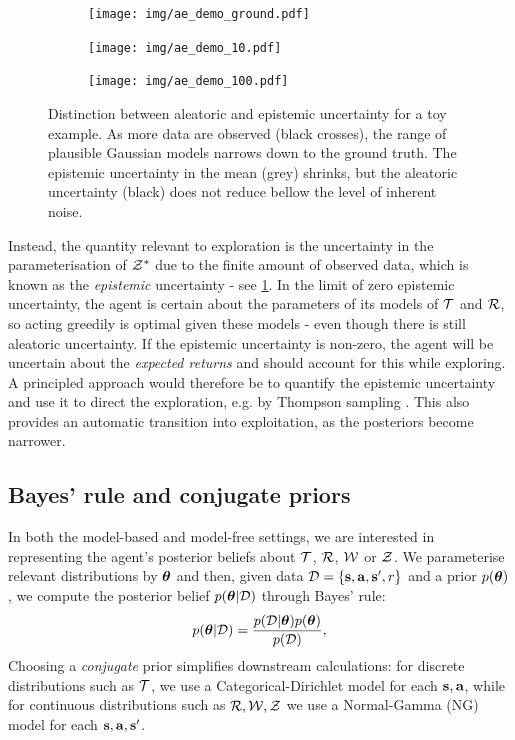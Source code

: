 \documentclass{article}
\begin{document}
\begin{figure}[h!]
\centering
\begin{subfigure}{0.22\textwidth}
\texttt{[image: img/ae\_demo\_ground.pdf]}
\end{subfigure}
\begin{subfigure}{0.22\textwidth}
\texttt{[image: img/ae\_demo\_10.pdf]}
\end{subfigure}
\begin{subfigure}{0.22\textwidth}
\texttt{[image: img/ae\_demo\_100.pdf]}
\end{subfigure}
\captionsetup{width=0.9\linewidth}
\caption{Distinction between aleatoric and epistemic uncertainty for a toy example. As more data are observed (black crosses), the range of plausible Gaussian models narrows down to the ground truth. The epistemic uncertainty in the mean (grey) shrinks, but the aleatoric uncertainty (black) does not reduce bellow the level of inherent noise.}\label{ae_demo}
\end{figure}

Instead, the quantity relevant to exploration is the uncertainty in the parameterisation of $\mathcal{Z}^*$ due to the finite amount of observed data, which is known as the \textit{epistemic} uncertainty - see \cref{ae_demo}. In the limit of zero epistemic uncertainty, the agent is certain about the parameters of its models of $\mathcal{T}$ and $\mathcal{R}$, so acting greedily is optimal given these models - even though there is still aleatoric uncertainty. If the epistemic uncertainty is non-zero, the agent will be uncertain about the \textit{expected returns} and should account for this while exploring. A principled approach would therefore be to quantify the epistemic uncertainty and use it to direct the exploration, e.g. by Thompson sampling \citep{thompson}. This also provides an automatic transition into exploitation, as the posteriors become narrower.

\subsection{Bayes' rule and conjugate priors}

In both the model-based and model-free settings, we are interested in representing the agent's posterior beliefs about $\mathcal{T}$, $\mathcal{R}$, $\mathcal{W}$ or $\mathcal{Z}$. We parameterise relevant distributions by $\boldsymbol{\theta}$ and then, given data $\mathcal{D} = \{\mathbf{s}, \mathbf{a}, \mathbf{s}', r\}$ and a prior $p(\boldsymbol{\theta})$, we compute the posterior belief $p(\boldsymbol{\theta} | \mathcal{D})$ through Bayes' rule:
\begin{align}
p(\boldsymbol{\theta} | \mathcal{D}) = \frac{p(\mathcal{D} | \boldsymbol{\theta}) p(\boldsymbol{\theta})}{p(\mathcal{D})},
\end{align}
Choosing a \textit{conjugate} prior simplifies downstream calculations: for discrete distributions such as $\mathcal{T}$, we use a Categorical-Dirichlet model \citep{bishop} for each $\mathbf{s}, \mathbf{a}$, while for continuous distributions such as $\mathcal{R}, \mathcal{W}, \mathcal{Z}$ we use a Normal-Gamma (NG) model \citep{murphy} for each $\mathbf{s}, \mathbf{a}, \mathbf{s}'$.
\end{document}
